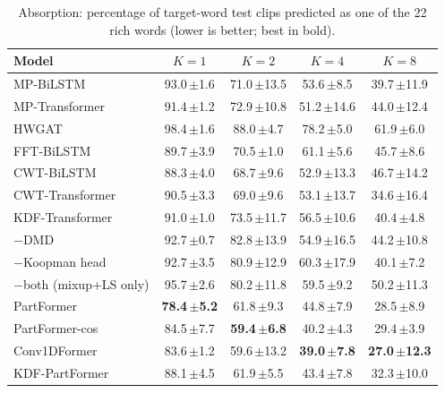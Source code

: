 \begin{table}[t]
\centering
\small
\caption{Absorption: percentage of target-word test clips predicted as one of the 22 rich words (lower is better; best in bold).}
\label{tab:absorb}
\begin{tabular}{lcccc}
\toprule
Model & $K=1$ & $K=2$ & $K=4$ & $K=8$ \\
\midrule
MP-BiLSTM & 93.0\,{\scriptsize$\pm$1.6} & 71.0\,{\scriptsize$\pm$13.5} & 53.6\,{\scriptsize$\pm$8.5} & 39.7\,{\scriptsize$\pm$11.9} \\
MP-Transformer & 91.4\,{\scriptsize$\pm$1.2} & 72.9\,{\scriptsize$\pm$10.8} & 51.2\,{\scriptsize$\pm$14.6} & 44.0\,{\scriptsize$\pm$12.4} \\
\midrule
HWGAT & 98.4\,{\scriptsize$\pm$1.6} & 88.0\,{\scriptsize$\pm$4.7} & 78.2\,{\scriptsize$\pm$5.0} & 61.9\,{\scriptsize$\pm$6.0} \\
\midrule
FFT-BiLSTM & 89.7\,{\scriptsize$\pm$3.9} & 70.5\,{\scriptsize$\pm$1.0} & 61.1\,{\scriptsize$\pm$5.6} & 45.7\,{\scriptsize$\pm$8.6} \\
CWT-BiLSTM & 88.3\,{\scriptsize$\pm$4.0} & 68.7\,{\scriptsize$\pm$9.6} & 52.9\,{\scriptsize$\pm$13.3} & 46.7\,{\scriptsize$\pm$14.2} \\
CWT-Transformer & 90.5\,{\scriptsize$\pm$3.3} & 69.0\,{\scriptsize$\pm$9.6} & 53.1\,{\scriptsize$\pm$13.7} & 34.6\,{\scriptsize$\pm$16.4} \\
\midrule
KDF-Transformer & 91.0\,{\scriptsize$\pm$1.0} & 73.5\,{\scriptsize$\pm$11.7} & 56.5\,{\scriptsize$\pm$10.6} & 40.4\,{\scriptsize$\pm$4.8} \\
\quad $-$DMD & 92.7\,{\scriptsize$\pm$0.7} & 82.8\,{\scriptsize$\pm$13.9} & 54.9\,{\scriptsize$\pm$16.5} & 44.2\,{\scriptsize$\pm$10.8} \\
\quad $-$Koopman head & 92.7\,{\scriptsize$\pm$3.5} & 80.9\,{\scriptsize$\pm$12.9} & 60.3\,{\scriptsize$\pm$17.9} & 40.1\,{\scriptsize$\pm$7.2} \\
\quad $-$both (mixup+LS only) & 95.7\,{\scriptsize$\pm$2.6} & 80.2\,{\scriptsize$\pm$11.8} & 59.5\,{\scriptsize$\pm$9.2} & 50.2\,{\scriptsize$\pm$11.3} \\
\midrule
PartFormer & \textbf{78.4\,{\scriptsize$\pm$5.2}} & 61.8\,{\scriptsize$\pm$9.3} & 44.8\,{\scriptsize$\pm$7.9} & 28.5\,{\scriptsize$\pm$8.9} \\
PartFormer-cos & 84.5\,{\scriptsize$\pm$7.7} & \textbf{59.4\,{\scriptsize$\pm$6.8}} & 40.2\,{\scriptsize$\pm$4.3} & 29.4\,{\scriptsize$\pm$3.9} \\
Conv1DFormer & 83.6\,{\scriptsize$\pm$1.2} & 59.6\,{\scriptsize$\pm$13.2} & \textbf{39.0\,{\scriptsize$\pm$7.8}} & \textbf{27.0\,{\scriptsize$\pm$12.3}} \\
KDF-PartFormer & 88.1\,{\scriptsize$\pm$4.5} & 61.9\,{\scriptsize$\pm$5.5} & 43.4\,{\scriptsize$\pm$7.8} & 32.3\,{\scriptsize$\pm$10.0} \\
\bottomrule
\end{tabular}
\end{table}
